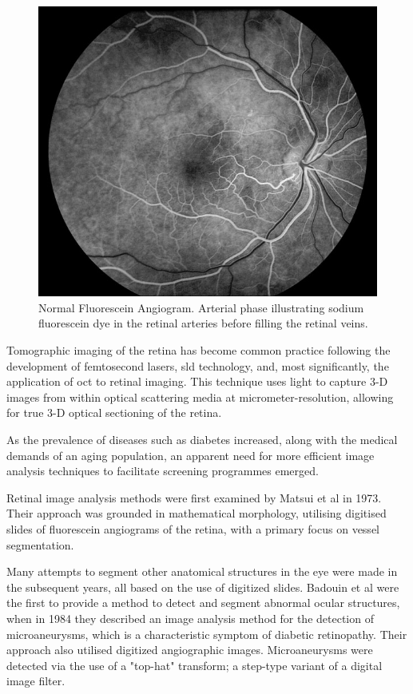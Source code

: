 \begin{figure}[H]
\centering
  \includegraphics{figures/fluore_angio}
\caption{Normal Fluorescein Angiogram. Arterial phase illustrating sodium fluorescein dye in the retinal arteries before filling the retinal veins.\cite{3_medicine.uiowa.edu_2015}}
\label{fig:fluore_angio_image}
\end{figure}

Tomographic imaging of the retina has become common practice following
the development of femtosecond \Gls{laser}s, \Gls{sld} technology, and,
most significantly, the application of \Gls{oct}
to retinal imaging.\cite{huang1991optical}  This technique uses light to capture
3-D images from within optical scattering media at micrometer-resolution,
allowing for true 3-D optical sectioning of the retina.\cite{van2007recent}

As the prevalence of diseases such as diabetes increased, along with
the medical demands of an aging population, an apparent need
for more efficient image analysis techniques to facilitate screening
programmes emerged.\cite{king1998global}

Retinal image analysis methods were first examined by Matsui et al
in 1973.\cite{matsui1973study}  Their approach was grounded in
mathematical morphology, utilising digitised slides of fluorescein
angiograms of the retina, with a primary focus on vessel segmentation.

Many attempts to segment other anatomical structures in the eye were
 made in the subsequent years, all based on the use of digitized slides.
Badouin et al were the first to provide a method to detect and segment
abnormal ocular structures, when in 1984 they described an image analysis
method for the detection of microaneurysms, which is a characteristic symptom
of diabetic retinopathy.\cite{baudoin1983automatic}  Their approach also
utilised digitized angiographic images.  Microaneurysms were detected
via the use of a "top-hat" transform; a step-type variant of a digital image filter.\cite{sonka1998image}  

